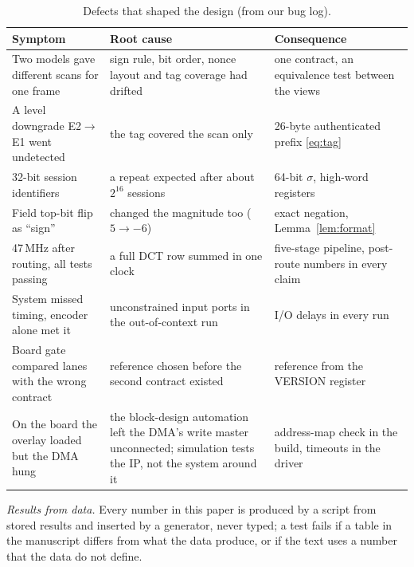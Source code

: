 \begin{table}[t]
\caption{Defects that shaped the design (from our bug log).}
\label{tab:bugs}
\centering\small\setlength{\tabcolsep}{4pt}
\begin{tabular}{p{}p{}p{}}
\toprule
Symptom & Root cause & Consequence \\
\midrule
Two models gave different scans for one frame & sign rule, bit order, nonce layout and tag coverage had drifted & one contract, an equivalence test between the views \\
A level downgrade E2$\to$E1 went undetected & the tag covered the scan only & 26-byte authenticated prefix \eqref{eq:tag} \\
32-bit session identifiers & a repeat expected after about $2^{16}$ sessions & 64-bit $\sigma$, high-word registers \\
Field top-bit flip as ``sign'' & changed the magnitude too ($5 \to -6$) & exact negation, Lemma~\ref{lem:format} \\
47\,MHz after routing, all tests passing & a full DCT row summed in one clock & five-stage pipeline, post-route numbers in every claim \\
System missed timing, encoder alone met it & unconstrained input ports in the out-of-context run & I/O delays in every run \\
Board gate compared lanes with the wrong contract & reference chosen before the second contract existed & reference from the VERSION register \\
On the board the overlay loaded but the DMA hung & the block-design automation left the DMA's write master unconnected; simulation tests the IP, not the system around it & address-map check in the build, timeouts in the driver \\
\bottomrule
\end{tabular}
\end{table}

\textit{Results from data.} Every number in this paper is produced by a script from stored results and inserted by a generator, never typed; a test fails if a table in the manuscript differs from what the data produce, or if the text uses a number that the data do not define.
